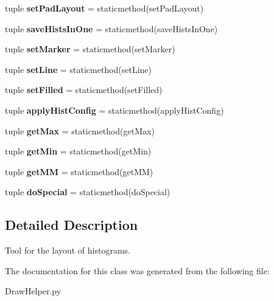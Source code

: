 \begin{CompactItemize}
\item 
\hypertarget{classtools_1_1DrawHelper_1_1Helper_2b1c079cf7ed2f1cd6adfafa1600274b}{
tuple \textbf{setPadLayout} = staticmethod(setPadLayout)}
\label{classtools_1_1DrawHelper_1_1Helper_2b1c079cf7ed2f1cd6adfafa1600274b}

\item 
\hypertarget{classtools_1_1DrawHelper_1_1Helper_96a2fbfd45267badf7bbdb29aa0222c4}{
tuple \textbf{saveHistsInOne} = staticmethod(saveHistsInOne)}
\label{classtools_1_1DrawHelper_1_1Helper_96a2fbfd45267badf7bbdb29aa0222c4}

\item 
\hypertarget{classtools_1_1DrawHelper_1_1Helper_30174c23c76fc088eac806dfdc181ef8}{
tuple \textbf{setMarker} = staticmethod(setMarker)}
\label{classtools_1_1DrawHelper_1_1Helper_30174c23c76fc088eac806dfdc181ef8}

\item 
\hypertarget{classtools_1_1DrawHelper_1_1Helper_ac67d0af3c64f09cb58498560f4a618d}{
tuple \textbf{setLine} = staticmethod(setLine)}
\label{classtools_1_1DrawHelper_1_1Helper_ac67d0af3c64f09cb58498560f4a618d}

\item 
\hypertarget{classtools_1_1DrawHelper_1_1Helper_3ceb0a9ed4ed13dc6bc3a7a8e97a2770}{
tuple \textbf{setFilled} = staticmethod(setFilled)}
\label{classtools_1_1DrawHelper_1_1Helper_3ceb0a9ed4ed13dc6bc3a7a8e97a2770}

\item 
\hypertarget{classtools_1_1DrawHelper_1_1Helper_63485ed9927b1f1681deb34ed53ac452}{
tuple \textbf{applyHistConfig} = staticmethod(applyHistConfig)}
\label{classtools_1_1DrawHelper_1_1Helper_63485ed9927b1f1681deb34ed53ac452}

\item 
\hypertarget{classtools_1_1DrawHelper_1_1Helper_65e6115c7101712e8130559d3a566c1a}{
tuple \textbf{getMax} = staticmethod(getMax)}
\label{classtools_1_1DrawHelper_1_1Helper_65e6115c7101712e8130559d3a566c1a}

\item 
\hypertarget{classtools_1_1DrawHelper_1_1Helper_61f505d4b9c502943281adcb96324783}{
tuple \textbf{getMin} = staticmethod(getMin)}
\label{classtools_1_1DrawHelper_1_1Helper_61f505d4b9c502943281adcb96324783}

\item 
\hypertarget{classtools_1_1DrawHelper_1_1Helper_5fcc69bb8d10df8334fcbbeb67d5fa24}{
tuple \textbf{getMM} = staticmethod(getMM)}
\label{classtools_1_1DrawHelper_1_1Helper_5fcc69bb8d10df8334fcbbeb67d5fa24}

\item 
\hypertarget{classtools_1_1DrawHelper_1_1Helper_7fa5c592116c6986786d0c45bf8cef27}{
tuple \textbf{doSpecial} = staticmethod(doSpecial)}
\label{classtools_1_1DrawHelper_1_1Helper_7fa5c592116c6986786d0c45bf8cef27}

\end{CompactItemize}


\subsection{Detailed Description}
Tool for the layout of histograms. 

The documentation for this class was generated from the following file:\begin{CompactItemize}
\item 
DrawHelper.py\end{CompactItemize}
